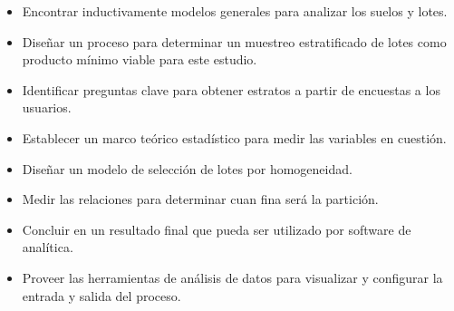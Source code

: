 \begin{itemize}
    \item Encontrar inductivamente modelos generales para analizar los suelos y lotes.

    \item Diseñar un proceso para determinar un muestreo estratificado de lotes como producto mínimo viable para este estudio.

    \item Identificar preguntas clave para obtener estratos a partir de encuestas a los usuarios.

    \item Establecer un marco teórico estadístico para medir las variables en cuestión.

    \item Diseñar un modelo de selección de lotes por homogeneidad.

    \item Medir las relaciones para determinar cuan fina será la partición.

    \item Concluir en un resultado final que pueda ser utilizado por software de analítica.

    \item Proveer las herramientas de análisis de datos para visualizar y configurar la entrada y salida del proceso.
\end{itemize}
